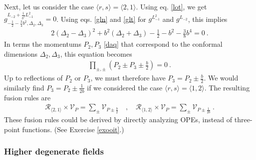 \documentclass[12pt, a4paper, notitlepage, twoside]{report}
\numberwithin{equation}{section}
\theoremstyle{break}
\begin{document}
Next, let us consider the case $\langle r,s \rangle = \langle 2,1 \rangle$.
Using eq. \eqref{lot}, we get
$g^{L_{-2} +\frac{1}{b^2} L_{-1}^2 }_{-\frac12 -\frac34 b^2,\Delta_2,\Delta_3} = 0$.
Using eqs. \eqref{gln} and \eqref{glt} for $g^{L_{-1}^2}$ and $g^{L_{-2}}$, this implies
\begin{align}
 2(\Delta_2-\Delta_3)^2 + b^2 (\Delta_2+\Delta_3) - \frac12 - b^2 -\frac38 b^4= 0\ .
\end{align}
In terms the momentums $P_2,P_3$ \eqref{daq} that correspond to the conformal dimensions $\Delta_2,\Delta_3$, this equation becomes
\begin{align}
\prod_{\pm,\pm} \left(P_2\pm P_3 \pm \frac{b}{2}\right) = 0 \ .
\end{align}
Up to reflections of $P_2$ or $P_3$, we must therefore have
$
 P_3 = P_2 \pm \frac{b}{2}
$.
We would similarly find $P_3 = P_2 \pm \frac{1}{2b}$ if we considered the case $\langle r,s\rangle = \langle 1,2\rangle$. 
The resulting fusion rules are 
\begin{align}
\boxed{ \mathcal{R}_{\langle 2,1 \rangle}\times \mathcal{V}_P = \sum_\pm \mathcal{V}_{P \pm \frac{b}{2}} }\quad , \quad 
\boxed{ \mathcal{R}_{\langle 1,2 \rangle}\times \mathcal{V}_P = \sum_\pm \mathcal{V}_{P \pm \frac{1}{2b}} }\ .
\label{rot}
\end{align}
These fusion rules could be derived by directly analyzing OPEs, instead of three-point functions. (See Exercise \ref{exooit}.) 

\subsubsection{Higher degenerate fields}
\end{document}
